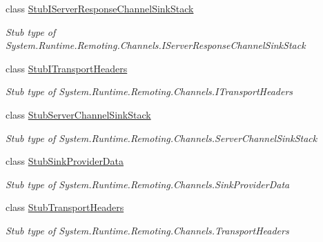 \begin{DoxyCompactItemize}
class \hyperlink{class_system_1_1_runtime_1_1_remoting_1_1_channels_1_1_fakes_1_1_stub_i_server_response_channel_sink_stack}{Stub\-I\-Server\-Response\-Channel\-Sink\-Stack}
\begin{DoxyCompactList}\small\item\em Stub type of System.\-Runtime.\-Remoting.\-Channels.\-I\-Server\-Response\-Channel\-Sink\-Stack\end{DoxyCompactList}\item 
class \hyperlink{class_system_1_1_runtime_1_1_remoting_1_1_channels_1_1_fakes_1_1_stub_i_transport_headers}{Stub\-I\-Transport\-Headers}
\begin{DoxyCompactList}\small\item\em Stub type of System.\-Runtime.\-Remoting.\-Channels.\-I\-Transport\-Headers\end{DoxyCompactList}\item 
class \hyperlink{class_system_1_1_runtime_1_1_remoting_1_1_channels_1_1_fakes_1_1_stub_server_channel_sink_stack}{Stub\-Server\-Channel\-Sink\-Stack}
\begin{DoxyCompactList}\small\item\em Stub type of System.\-Runtime.\-Remoting.\-Channels.\-Server\-Channel\-Sink\-Stack\end{DoxyCompactList}\item 
class \hyperlink{class_system_1_1_runtime_1_1_remoting_1_1_channels_1_1_fakes_1_1_stub_sink_provider_data}{Stub\-Sink\-Provider\-Data}
\begin{DoxyCompactList}\small\item\em Stub type of System.\-Runtime.\-Remoting.\-Channels.\-Sink\-Provider\-Data\end{DoxyCompactList}\item 
class \hyperlink{class_system_1_1_runtime_1_1_remoting_1_1_channels_1_1_fakes_1_1_stub_transport_headers}{Stub\-Transport\-Headers}
\begin{DoxyCompactList}\small\item\em Stub type of System.\-Runtime.\-Remoting.\-Channels.\-Transport\-Headers\end{DoxyCompactList}\end{DoxyCompactItemize}
